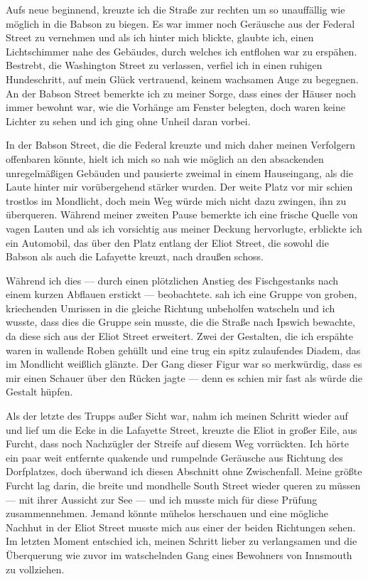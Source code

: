 Aufs neue beginnend, kreuzte ich die Straße zur rechten um so unauffällig wie möglich in die Babson zu biegen. Es war immer noch Geräusche aus der Federal Street zu vernehmen und als ich hinter mich blickte, glaubte ich, einen Lichtschimmer nahe des Gebäudes, durch welches ich entflohen war zu erspähen. Bestrebt, die Washington Street zu verlassen, verfiel ich in einen ruhigen Hundeschritt, auf mein Glück vertrauend, keinem wachsamen Auge zu begegnen. An der Babson Street bemerkte ich zu meiner Sorge, dass eines der Häuser noch immer bewohnt war, wie die Vorhänge am Fenster belegten, doch waren keine Lichter zu sehen und ich ging ohne Unheil daran vorbei.

In der Babson Street, die die Federal kreuzte und mich daher meinen Verfolgern offenbaren könnte, hielt ich mich so nah wie möglich an den absackenden unregelmäßigen Gebäuden und pausierte zweimal in einem Hauseingang, als die Laute hinter mir vorübergehend stärker wurden. Der weite Platz vor mir schien trostlos im Mondlicht, doch mein Weg würde mich nicht dazu zwingen, ihn zu überqueren. Während meiner zweiten Pause bemerkte ich eine frische Quelle von vagen Lauten und als ich vorsichtig aus meiner Deckung hervorlugte, erblickte ich ein Automobil, das über den Platz entlang der Eliot Street, die sowohl die Babson als auch die Lafayette kreuzt, nach draußen schoss.

Während ich dies --- durch einen plötzlichen Anstieg des Fischgestanks nach einem kurzen Abflauen erstickt --- beobachtete. sah ich eine Gruppe von groben, kriechenden Umrissen in die gleiche Richtung unbeholfen watscheln und ich wusste, dass dies die Gruppe sein musste, die die Straße nach Ipswich bewachte, da diese sich aus der Eliot Street erweitert. Zwei der Gestalten, die ich erspähte waren in wallende Roben gehüllt und eine trug ein spitz zulaufendes Diadem, das im Mondlicht weißlich glänzte. Der Gang dieser Figur war so merkwürdig, dass es mir einen Schauer über den Rücken jagte --- denn es schien mir fast als würde die Gestalt hüpfen.

Als der letzte des Trupps außer Sicht war, nahm ich meinen Schritt wieder auf und lief um die Ecke in die Lafayette Street, kreuzte die Eliot in großer Eile, aus Furcht, dass noch Nachzügler der Streife auf diesem Weg vorrückten. Ich hörte ein paar weit entfernte quakende und rumpelnde Geräusche aus Richtung des Dorfplatzes, doch überwand ich diesen Abschnitt ohne Zwischenfall. Meine größte Furcht lag darin, die breite und mondhelle South Street wieder queren zu müssen --- mit ihrer Aussicht zur See --- und ich musste mich für diese Prüfung zusammennehmen. Jemand könnte mühelos herschauen und eine mögliche Nachhut in der Eliot Street musste mich aus einer der beiden Richtungen sehen. Im letzten Moment entschied ich, meinen Schritt lieber zu verlangsamen und die Überquerung wie zuvor im watschelnden Gang eines Bewohners von Innsmouth zu vollziehen.

